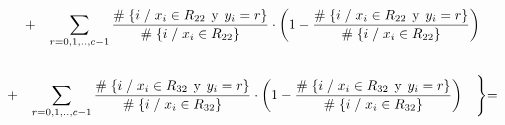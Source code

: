 \documentclass[
  11pt,
  a4paper,
]{article}
\begin{document}
\begin{gather*}
\hspace{0.3cm} +  \hspace{0.3cm}         \sum_{r=0,1,..,c-1}^{}  \dfrac{\# \hspace{0.1 cm}\lbrace i \hspace{0.1 cm}/\hspace{0.1 cm} x_i \in R_{22} \hspace{0.15 cm}\text{y}\hspace{0.15 cm} y_i = r  \rbrace}{\# \hspace{0.1 cm}\lbrace i \hspace{0.1 cm}/\hspace{0.1 cm} x_i \in R_{22}  \rbrace}  \cdot \left(   1 - \dfrac{\# \hspace{0.1 cm}\lbrace i \hspace{0.1 cm}/\hspace{0.1 cm} x_i \in R_{22} \hspace{0.15 cm}\text{y}\hspace{0.15 cm} y_i = r  \rbrace}{\# \hspace{0.1 cm}\lbrace i \hspace{0.1 cm}/\hspace{0.1 cm} x_i \in R_{22}  \rbrace}  \right)    \\ \\
\hspace{0.3cm} +  \hspace{0.3cm}  \sum_{r=0,1,..,c-1}^{}  \dfrac{\# \hspace{0.1 cm}\lbrace i \hspace{0.1 cm}/\hspace{0.1 cm} x_i \in R_{32} \hspace{0.15 cm}\text{y}\hspace{0.15 cm} y_i = r  \rbrace}{\# \hspace{0.1 cm}\lbrace i \hspace{0.1 cm}/\hspace{0.1 cm} x_i \in R_{32}  \rbrace}  \cdot \left(   1 - \dfrac{\# \hspace{0.1 cm}\lbrace i \hspace{0.1 cm}/\hspace{0.1 cm} x_i \in R_{32} \hspace{0.15 cm}\text{y}\hspace{0.15 cm} y_i = r  \rbrace}{\# \hspace{0.1 cm}\lbrace i \hspace{0.1 cm}/\hspace{0.1 cm} x_i \in R_{32}  \rbrace}  \right)    \hspace{0.3cm} \Biggl\} =    \\ \\ 

\end{gather*}
\end{document}
